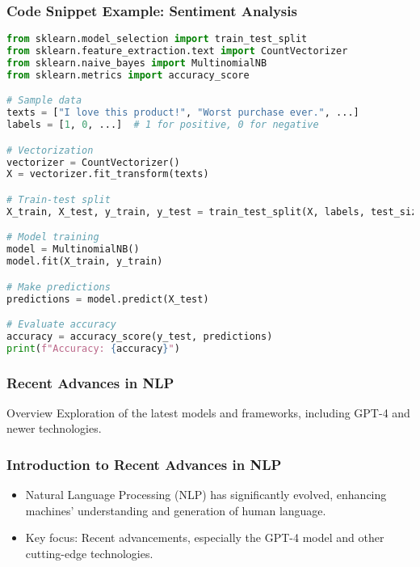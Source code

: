 \documentclass[aspectratio=169]{beamer}
\begin{document}
\begin{frame}[fragile]
    \frametitle{Code Snippet Example: Sentiment Analysis}
    \begin{lstlisting}[language=Python]
from sklearn.model_selection import train_test_split
from sklearn.feature_extraction.text import CountVectorizer
from sklearn.naive_bayes import MultinomialNB
from sklearn.metrics import accuracy_score

# Sample data
texts = ["I love this product!", "Worst purchase ever.", ...]
labels = [1, 0, ...]  # 1 for positive, 0 for negative

# Vectorization
vectorizer = CountVectorizer()
X = vectorizer.fit_transform(texts)

# Train-test split
X_train, X_test, y_train, y_test = train_test_split(X, labels, test_size=0.2)

# Model training
model = MultinomialNB()
model.fit(X_train, y_train)

# Make predictions
predictions = model.predict(X_test)

# Evaluate accuracy
accuracy = accuracy_score(y_test, predictions)
print(f"Accuracy: {accuracy}")
    \end{lstlisting}
\end{frame}

\begin{frame}
    \frametitle{Recent Advances in NLP}
    \begin{block}{Overview}
        Exploration of the latest models and frameworks, including GPT-4 and newer technologies.
    \end{block}
\end{frame}

\begin{frame}[fragile]
    \frametitle{Introduction to Recent Advances in NLP}
    \begin{itemize}
        \item Natural Language Processing (NLP) has significantly evolved, enhancing machines' understanding and generation of human language.
        \item Key focus: Recent advancements, especially the GPT-4 model and other cutting-edge technologies.
    \end{itemize}
\end{frame}
\end{document}
